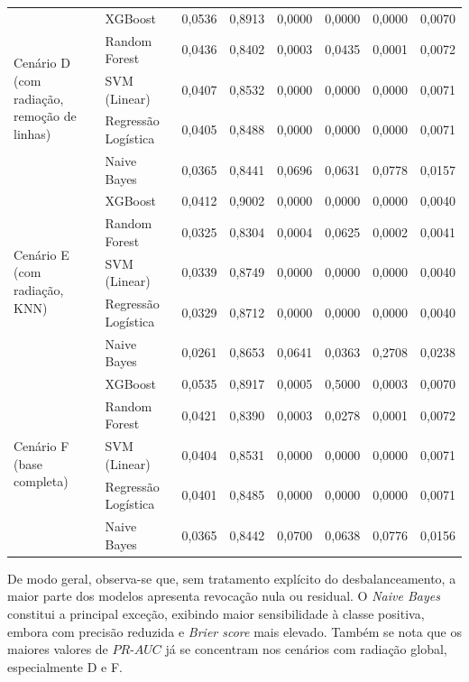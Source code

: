 \begin{longtable}{p{3.2cm} l c c c c c c}
\multirow{5}{*}{\parbox{3.2cm}{\centering Cenário D\\(com radiação, remoção de linhas)}} 
   & XGBoost             & 0,0536 & 0,8913 & 0,0000 & 0,0000 & 0,0000 & 0,0070 \\
   & Random Forest       & 0,0436 & 0,8402 & 0,0003 & 0,0435 & 0,0001 & 0,0072 \\
   & SVM (Linear)        & 0,0407 & 0,8532 & 0,0000 & 0,0000 & 0,0000 & 0,0071 \\
   & Regressão Logística & 0,0405 & 0,8488 & 0,0000 & 0,0000 & 0,0000 & 0,0071 \\
   & Naive Bayes         & 0,0365 & 0,8441 & 0,0696 & 0,0631 & 0,0778 & 0,0157 \\
\midrule

\multirow{5}{*}{\parbox{3.2cm}{\centering Cenário E\\(com radiação, KNN)}} 
   & XGBoost             & 0,0412 & 0,9002 & 0,0000 & 0,0000 & 0,0000 & 0,0040 \\
   & Random Forest       & 0,0325 & 0,8304 & 0,0004 & 0,0625 & 0,0002 & 0,0041 \\
   & SVM (Linear)        & 0,0339 & 0,8749 & 0,0000 & 0,0000 & 0,0000 & 0,0040 \\
   & Regressão Logística & 0,0329 & 0,8712 & 0,0000 & 0,0000 & 0,0000 & 0,0040 \\
   & Naive Bayes         & 0,0261 & 0,8653 & 0,0641 & 0,0363 & 0,2708 & 0,0238 \\
\midrule

\multirow{5}{*}{\parbox{3.2cm}{\centering Cenário F\\(base completa)}} 
   & XGBoost             & 0,0535 & 0,8917 & 0,0005 & 0,5000 & 0,0003 & 0,0070 \\
   & Random Forest       & 0,0421 & 0,8390 & 0,0003 & 0,0278 & 0,0001 & 0,0072 \\
   & SVM (Linear)        & 0,0404 & 0,8531 & 0,0000 & 0,0000 & 0,0000 & 0,0071 \\
   & Regressão Logística & 0,0401 & 0,8485 & 0,0000 & 0,0000 & 0,0000 & 0,0071 \\
   & Naive Bayes         & 0,0365 & 0,8442 & 0,0700 & 0,0638 & 0,0776 & 0,0156 \\
\end{longtable}
\endgroup

De modo geral, observa-se que, sem tratamento explícito do desbalanceamento, a maior parte dos modelos apresenta revocação nula ou residual. O \textit{Naive Bayes} constitui a principal exceção, exibindo maior sensibilidade à classe positiva, embora com precisão reduzida e \textit{Brier score} mais elevado. Também se nota que os maiores valores de $PR\text{-}AUC$ já se concentram nos cenários com radiação global, especialmente D e F.

